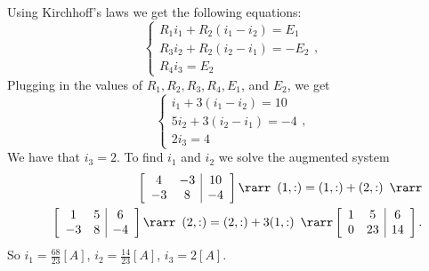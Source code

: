 \vspace{2mm}
Using Kirchhoff's laws we get the following equations:
$$
\left\{\begin{array}{c}R_1i_1+R_2(i_1-i_2)=E_1 \\ R_3i_2+R_2(i_2-i_1)=-E_2\\R_4i_3=E_2 \end{array}\right.,
$$
Plugging in the values of $R_1,R_2,R_3,R_4,E_1$, and $E_2$, we get
$$
\left\{\begin{array}{c}i_1+3(i_1-i_2)=10 \\ 5i_2+3(i_2-i_1)=-4\\2i_3=4 \end{array}\right.,
$$
We have that $i_3=2$. To find $i_1$ and $i_2$ we solve the augmented system
\begin{eqnarray*}
&&\left[\begin{array}{cc|c} 4&-3&10\\-3&8&-4 \end{array}\right]\rarr
\begin{array}{c} (1,:)=(1,:)+(2,:) \end{array}\rarr\\
&&\left[\begin{array}{cc|c} 1&5&6\\-3&8&-4 \end{array}\right]\rarr
\begin{array}{c} (2,:)=(2,:)+3(1,:) \end{array}\rarr
\left[\begin{array}{cc|c} 1&5&6\\0&23&14 \end{array}\right].
\end{eqnarray*}
So $i_1=\frac{68}{23}[A]$, $i_2=\frac{14}{23}[A]$, $i_3=2[A]$.

